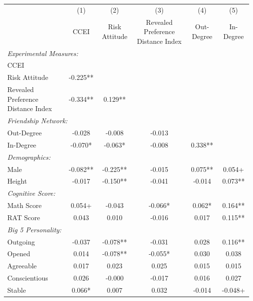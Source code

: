 \begin{tabular}{l*{5}{c}}
\toprule
  & (1) & (2) & (3) & (4) & (5) \\
  & CCEI & Risk Attitude & Revealed Preference Distance Index & Out-Degree & In-Degree \\
\midrule
\multicolumn{6}{l}{\textit{Experimental Measures:}} \\
\quad CCEI &  &  &  &  &  \\
\quad Risk Attitude & -0.225** &  &  &  &  \\
\quad Revealed Preference Distance Index & -0.334** & 0.129** &  &  &  \\
\multicolumn{6}{l}{\textit{Friendship Network:}} \\
\quad Out-Degree & -0.028 & -0.008 & -0.013 &  &  \\
\quad In-Degree & -0.070* & -0.063* & -0.008 & 0.338** &  \\
\multicolumn{6}{l}{\textit{Demographics:}} \\
\quad Male & -0.082** & -0.225** & -0.015 & 0.075** & 0.054+ \\
\quad Height & -0.017 & -0.150** & -0.041 & -0.014 & 0.073** \\
\multicolumn{6}{l}{\textit{Cognitive Score:}} \\
\quad Math Score & 0.054+ & -0.043 & -0.066* & 0.062* & 0.164** \\
\quad RAT Score & 0.043 & 0.010 & -0.016 & 0.017 & 0.115** \\
\multicolumn{6}{l}{\textit{Big 5 Personality:}} \\
\quad Outgoing & -0.037 & -0.078** & -0.031 & 0.028 & 0.116** \\
\quad Opened & 0.014 & -0.078** & -0.055* & 0.030 & 0.038 \\
\quad Agreeable & 0.017 & 0.023 & 0.025 & 0.015 & 0.015 \\
\quad Conscientious & 0.026 & -0.000 & -0.017 & 0.016 & 0.027 \\
\quad Stable & 0.066* & 0.007 & 0.032 & -0.014 & -0.048+ \\
\bottomrule
\end{tabular}
